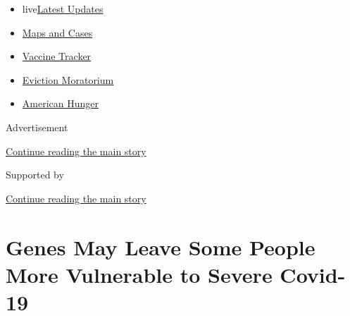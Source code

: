 \begin{itemize}
\tightlist
\item
  live\href{https://www.nytimes3xbfgragh.onion/2020/09/05/world/coronavirus-covid.html?name=styln-coronavirus-national\&region=TOP_BANNER\&block=storyline_menu_recirc\&action=click\&pgtype=Article\&impression_id=79805dc0-efbb-11ea-a5dd-151e10eb2059\&variant=undefined}{Latest
  Updates}
\item
  \href{https://www.nytimes3xbfgragh.onion/interactive/2020/us/coronavirus-us-cases.html?name=styln-coronavirus-national\&region=TOP_BANNER\&block=storyline_menu_recirc\&action=click\&pgtype=Article\&impression_id=79805dc1-efbb-11ea-a5dd-151e10eb2059\&variant=undefined}{Maps
  and Cases}
\item
  \href{https://www.nytimes3xbfgragh.onion/interactive/2020/science/coronavirus-vaccine-tracker.html?name=styln-coronavirus-national\&region=TOP_BANNER\&block=storyline_menu_recirc\&action=click\&pgtype=Article\&impression_id=79805dc2-efbb-11ea-a5dd-151e10eb2059\&variant=undefined}{Vaccine
  Tracker}
\item
  \href{https://www.nytimes3xbfgragh.onion/2020/09/02/your-money/eviction-moratorium-covid.html?name=styln-coronavirus-national\&region=TOP_BANNER\&block=storyline_menu_recirc\&action=click\&pgtype=Article\&impression_id=79805dc3-efbb-11ea-a5dd-151e10eb2059\&variant=undefined}{Eviction
  Moratorium}
\item
  \href{https://www.nytimes3xbfgragh.onion/interactive/2020/09/02/magazine/food-insecurity-hunger-us.html?name=styln-coronavirus-national\&region=TOP_BANNER\&block=storyline_menu_recirc\&action=click\&pgtype=Article\&impression_id=79805dc4-efbb-11ea-a5dd-151e10eb2059\&variant=undefined}{American
  Hunger}
\end{itemize}

Advertisement

\protect\hyperlink{after-top}{Continue reading the main story}

Supported by

\protect\hyperlink{after-sponsor}{Continue reading the main story}

\hypertarget{genes-may-leave-some-people-more-vulnerable-to-severe-covid-19}{%
\section{Genes May Leave Some People More Vulnerable to Severe
Covid-19}\label{genes-may-leave-some-people-more-vulnerable-to-severe-covid-19}}

